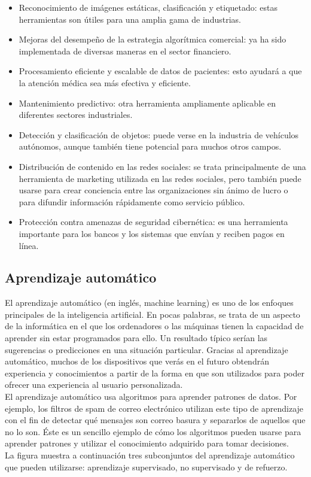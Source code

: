     \begin{itemize}
        \item Reconocimiento de imágenes estáticas, clasificación y etiquetado:  estas herramientas son útiles para una amplia gama de industrias.
        \item Mejoras del desempeño de la estrategia algorítmica comercial: ya ha sido implementada de diversas maneras en el sector financiero.
        \item Procesamiento eficiente y escalable de datos de pacientes: esto ayudará a que la atención médica sea más efectiva y eficiente.
        \item Mantenimiento predictivo: otra herramienta ampliamente aplicable en diferentes sectores industriales.
        \item Detección y clasificación de objetos: puede verse en la industria de vehículos autónomos, aunque también tiene potencial para muchos otros campos.
        \item Distribución de contenido en las redes sociales: se trata principalmente de una herramienta de marketing utilizada en las redes sociales, pero también puede usarse para crear conciencia entre las organizaciones sin ánimo de lucro o para difundir información rápidamente como servicio público.
        \item Protección contra amenazas de seguridad cibernética: es una herramienta importante para los bancos y los sistemas que envían y reciben pagos en línea.
    \end{itemize}

    \subsection{Aprendizaje automático}

    El aprendizaje automático (en inglés, machine learning) es uno de los enfoques principales de la inteligencia artificial. En pocas palabras, se trata de un aspecto de la informática en el que los ordenadores o las máquinas tienen la capacidad de aprender sin estar programados para ello. Un resultado típico serían las sugerencias o predicciones en una situación particular. Gracias al aprendizaje automático, muchos de los dispositivos que verás en el futuro obtendrán experiencia y conocimientos a partir de la forma en que son utilizados para poder ofrecer una experiencia al usuario personalizada.\\
    \newline
    El aprendizaje automático usa algoritmos para aprender patrones de datos. Por ejemplo, los filtros de spam de correo electrónico utilizan este tipo de aprendizaje con el fin de detectar qué mensajes son correo basura y separarlos de aquellos que no lo son. Éste es un sencillo ejemplo de cómo los algoritmos pueden usarse para aprender patrones y utilizar el conocimiento adquirido para tomar decisiones.\\
    \newline
    La figura  muestra a continuación tres subconjuntos del aprendizaje automático que pueden utilizarse: aprendizaje supervisado, no supervisado y de refuerzo.
    
